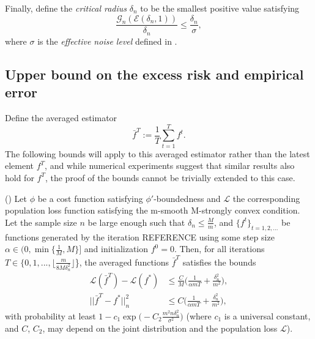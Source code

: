 Finally, define the \textit{critical radius} $\delta_n$ to be the smallest positive value satisfying
\begin{equation}
\frac{\mathcal{G}_n(\mathcal{E}(\delta_n,1))}{\delta_n} \le \frac{\delta_n}{\sigma},
\end{equation}
where $\sigma$ is the \textit{effective noise level} defined in \cite{wain17ada}.

\subsection{Upper bound on the excess risk and empirical error}
Define the averaged estimator
\begin{equation*}
\bar{f}^T := \frac{1}{T}\sum_{t=1}^T f^t.
\end{equation*}
The following bounds will apply to this averaged estimator rather than the latest element $f^T$, and while numerical experiments suggest that similar results also hold for $f^T$, the proof of the bounds cannot be trivially extended to this case.

\begin{theorem}
\label{thmbound}
(\cite{wain17ada}) Let $\phi$ be a cost function satisfying $\phi'$-boundedness and $\mathcal{L}$ the corresponding population loss function satisfying the m-smooth M-strongly convex condition. Let the sample size $n$ be large enough such that $\delta_n\le \frac{M}{m}$, and $\{f^t\}_{t=1,2,...}$ be functions generated by the iteration REFERENCE using some step size $\alpha\in (0,\min\{\frac{1}{M}, M\}]$ and initialization $f^0=0$. Then, for all iterations $T\in \{0,1,...,\lfloor\frac{m}{8M\delta_n^2}\rfloor$\}, the averaged functions $\bar{f}^T$ satisfies the bounds
\begin{align}
\mathcal{L}(\bar{f}^T) - \mathcal{L}(f^*) &\le \frac{C}{M}\Big(\frac{1}{\alpha m T} + \frac{\delta_n^2}{m^2}\Big), \label{bound1} \\
||\bar{f}^T-f^*||_n^2 &\le C\Big(\frac{1}{\alpha m T} + \frac{\delta_n^2}{m^2}\Big), \label{bound2}
\end{align}
with probability at least $1-c_1\exp\big(-C_2\frac{m^2n\delta_n^2}{\sigma^2}\big)$ (where $c_1$ is a universal constant, and $C$, $C_2$, may depend on the joint distribution and the population loss $\mathcal{L}$).
\end{theorem}

